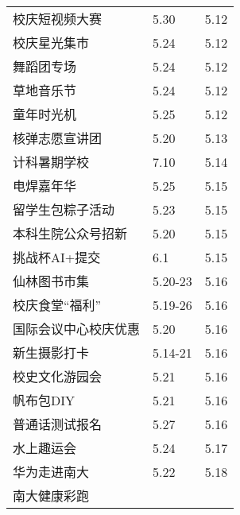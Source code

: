 \documentclass[letterpaper, 12pt]{article}
\begin{document}
\begin{multicols}{2}
{\begin{longtable}{|>{\centering\arraybackslash}m{}|m{}|m{}|}
    校庆短视频大赛 & 5.30 & 5.12\\
    校庆星光集市 & 5.24 & 5.12\\
    舞蹈团专场 & 5.24 & 5.12\\
    草地音乐节 & 5.24 & 5.12\\
    童年时光机 & 5.25 & 5.12\\
    核弹志愿宣讲团 & 5.20 & 5.13\\
    计科暑期学校 & 7.10 & 5.14\\
    电焊嘉年华 & 5.25 & 5.15\\
    留学生包粽子活动 & 5.23 & 5.15\\
    本科生院公众号招新 & 5.20 & 5.15\\
    挑战杯AI+提交 & 6.1 & 5.15\\
    仙林图书市集 & 5.20-23 & 5.16\\
    校庆食堂“福利” & 5.19-26 & 5.16\\
    国际会议中心校庆优惠 & 5.20 & 5.16\\
    新生摄影打卡 & 5.14-21 & 5.16\\
    校史文化游园会 & 5.21 & 5.16\\
    帆布包DIY & 5.21 & 5.16\\
    普通话测试报名 & 5.27 & 5.16\\
    水上趣运会 & 5.24 & 5.17\\
    华为走进南大 & 5.22 & 5.18\\
    南大健康彩跑
    \hline
\end{longtable}
\unskip
\unpenalty
\unpenalty}\unvbox\colbbox
\end{multicols}
\end{document}
